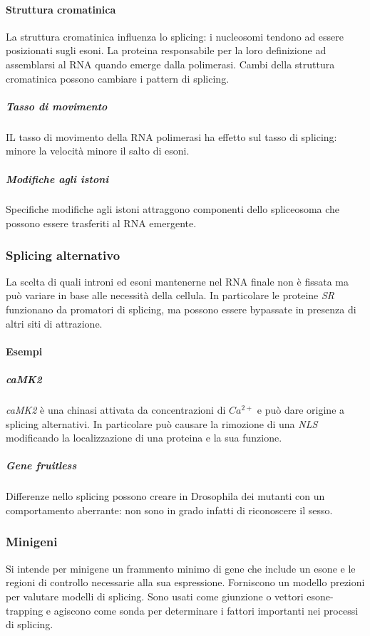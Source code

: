			\paragraph{Struttura cromatinica}
			La struttura cromatinica influenza lo splicing: i nucleosomi tendono ad essere posizionati sugli esoni.
			La proteina responsabile per la loro definizione ad assemblarsi al RNA quando emerge dalla polimerasi.
			Cambi della struttura cromatinica possono cambiare i pattern di splicing.

				\subparagraph{Tasso di movimento}
				IL tasso di movimento della RNA polimerasi ha effetto sul tasso di splicing: minore la velocit\`a minore il salto di esoni.

				\subparagraph{Modifiche agli istoni}
				Specifiche modifiche agli istoni attraggono componenti dello spliceosoma che possono essere trasferiti al RNA emergente.

		\subsubsection{Splicing alternativo}
		La scelta di quali introni ed esoni mantenerne nel RNA finale non \`e fissata ma pu\`o variare in base alle necessit\`a della cellula.
		In particolare le proteine \emph{SR} funzionano da promatori di splicing, ma possono essere bypassate in presenza di altri siti di attrazione.

			\paragraph{Esempi}

				\subparagraph{\emph{caMK2}}
				\emph{caMK2} \`e una chinasi attivata da concentrazioni di \emph{$Ca^{2+}$} e pu\`o dare origine a splicing alternativi.
				In particolare pu\`o causare la rimozione di una \emph{NLS} modificando la localizzazione di una proteina e la sua funzione.

				\subparagraph{Gene fruitless}
				Differenze nello splicing possono creare in Drosophila dei mutanti con un comportamento aberrante: non sono in grado infatti di riconoscere il sesso.

		\subsubsection{Minigeni}
		Si intende per minigene un frammento minimo di gene che include un esone e le regioni di controllo necessarie alla sua espressione.
		Forniscono un modello prezioni per valutare modelli di splicing.
		Sono usati come giunzione o vettori esone-trapping e agiscono come sonda per determinare i fattori importanti nei processi di splicing.

